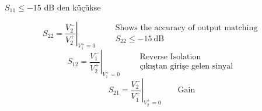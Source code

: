\documentclass[11pt,a4paper]{article}
\begin{document}
$S_{11} \leq -15$ dB den küçükse

\[ S_{22} = \left.\frac{V_2^-}{V_2^+}\right|_{V_1^+=0} \qquad \begin{array}{l}\text{Shows the accuracy of output matching}\\ S_{22} \leq -15\ \mathrm{dB}\end{array} \]
\[ S_{12} = \left.\frac{V_1^-}{V_2^+}\right|_{V_1^+=0} \qquad \begin{array}{l}\text{Reverse Isolation}\\ \text{çıkıştan girişe gelen sinyal}\end{array} \]
\[ S_{21} = \left.\frac{V_2^-}{V_1^+}\right|_{V_2^+=0} \qquad \text{Gain} \]
\end{document}
